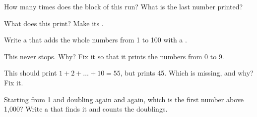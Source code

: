 \begin{exercise}[$\star$]\label{exo:g6:while-loops:2}
How many times does the block of this  run? What is the last number
printed?

\label{lst:g6:while-loops:turns}
\end{exercise}

\begin{exercise}[$\star$]\label{exo:g6:while-loops:3}
What does this  print? Make its .

\label{lst:g6:while-loops:squares-total}
\end{exercise}

\begin{exercise}[$\star$]\label{exo:g6:while-loops:4}
Write a  that adds the whole numbers from 1 to 100 with a 
.
\end{exercise}

\begin{exercise}[$\star\star$]\label{exo:g6:while-loops:5}
This  never stops. Why? Fix it so that it prints the numbers from 0 to 9.

\label{lst:g6:while-loops:never-bug}
\end{exercise}

\begin{exercise}[$\star\star$]\label{exo:g6:while-loops:6}
This  should print $1 + 2 + \dots + 10 = 55$, but prints 45. Which 
is missing, and why? Fix it.

\label{lst:g6:while-loops:total-bug}
\end{exercise}

\begin{exercise}[$\star\star$]\label{exo:g6:while-loops:7}
Starting from 1 and doubling again and again, which is the first number above
1,000? Write a  that finds it and counts the doublings.
\end{exercise}

